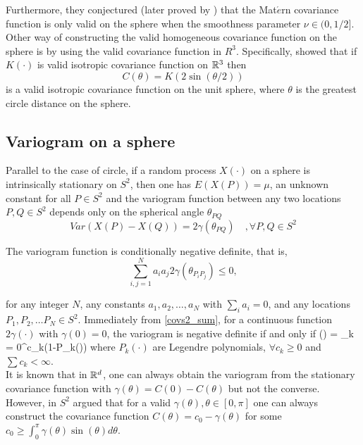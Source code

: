 Furthermore, they conjectured (later proved by \cite{Gneiting2013}) that the Mat$\acute{e}$rn covariance function is only valid on the sphere when the smoothness parameter $\nu\in(0,1/2]$. Other way of constructing the valid homogeneous covariance function on the sphere is by using the valid covariance function in $R^3$. Specifically, \cite{Yadrenko1983} showed that if $K(\cdot)$ is valid isotropic covariance function on $\mathbb{R}^3$ then
		\[
			C(\theta) = K(2\sin(\theta/2))
		\]
is a valid isotropic covariance function on the unit sphere, where $\theta$ is the greatest circle distance on the sphere.\\
			
		\subsection{Variogram on a sphere}
			
			
Parallel to the case of circle, if a random process $X(\cdot)$ on a sphere is intrinsically stationary on $S^2$, then one has $E(X(P))=\mu$, an unknown constant for all $P\in S^2$ and the variogram function between any two locations $P, Q \in S^2$ depends only on the spherical angle $\theta_{PQ}$			
		\[
			Var(X(P)-X(Q)) = 2\gamma(\theta_{PQ}) \quad , \forall P, Q \in S^2
		\]
			
		The variogram function is conditionally negative definite, that is,
		\[
			\sum_{i,j=1}^{N} a_i a_j 2\gamma(\theta_{P_iP_j}) \le 0,
		\]
			
for any integer $N$, any constants $a_1, a_2, \ldots, a_N$ with $\sum_i a_i = 0$, and any locations $P_1, P_2, \ldots P_N \in S^2$. Immediately from \ref{covs2_sum}, for a continuous function $2\gamma(\cdot)$ with $\gamma(0)=0$, the variogram is negative definite if and only if
		\beq
		\gamma(\theta) = \sum_{k = 0}^\infty c_k(1-P_k(\cos\theta))
		\eeq
where $P_{k}(\cdot)$ are Legendre polynomials, $\forall c_k\ge 0$ and $\sum c_k < \infty$. \\
			
It is known that in $\mathbb{R}^d$, one can always obtain the variogram from the stationary covariance function with $\gamma(\theta) = C(0) - C(\theta)$ but not the converse. However, in $S^2$ \cite{Yaglom1961} argued that for a valid $\gamma(\theta), \theta \in [0,\pi]$ one can always construct the covariance function $C(\theta)=c_0-\gamma(\theta)$ for some $c_0 \ge \int_0^{\pi} \gamma(\theta)\sin(\theta)d\theta$. \\
			
